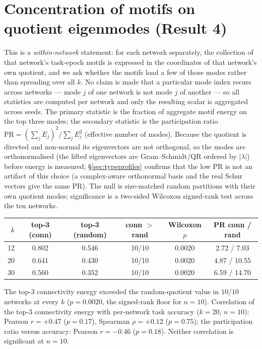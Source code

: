 \documentclass[11pt]{article}
\begin{document}
\section{Concentration of motifs on quotient eigenmodes (Result 4)}
\label{sec:concentration}
This is a \emph{within-network} statement: for each network separately, the collection of that
network's task-epoch motifs is expressed in the coordinates of that network's own quotient, and we
ask whether the motifs load a few of those modes rather than spreading over all $k$. No claim is
made that a particular mode index recurs across networks --- mode $j$ of one network is not mode
$j$ of another --- so all statistics are computed per network and only the resulting scalar is
aggregated across seeds. The primary statistic is the fraction of aggregate motif energy on the
top three modes; the secondary statistic is the participation ratio
$\mathrm{PR}=(\sum_{j}E_{j})^{2}/\sum_{j}E_{j}^{2}$ (effective number of modes). Because the
quotient is directed and non-normal its eigenvectors are not orthogonal, so the modes are
orthonormalised (the lifted eigenvectors are Gram--Schmidt/QR ordered by $\lvert\lambda\rvert$)
before energy is measured; \S\ref{sec:typeprofiles} confirms that the low PR is not an artifact of
this choice (a complex-aware orthonormal basis and the real Schur vectors give the same PR). The
null is size-matched random partitions with their own quotient modes; significance is a two-sided
Wilcoxon signed-rank test across the ten networks.
\begin{center}\small
\begin{tabular}{rccccc}
\toprule
$k$ & top-3 (conn) & top-3 (random) & conn $>$ rand & Wilcoxon $p$ & PR conn / rand \\
\midrule
12 & 0.802 & 0.546 & 10/10 & 0.0020 & 2.72 / 7.03 \\
20 & 0.641 & 0.430 & 10/10 & 0.0020 & 4.87 / 10.55 \\
30 & 0.560 & 0.352 & 10/10 & 0.0020 & 6.59 / 14.70 \\
\bottomrule
\end{tabular}
\end{center}
The top-3 connectivity energy exceeded the random-quotient value in $10/10$ networks at every
$k$ ($p=0.0020$, the signed-rank floor for $n=10$). Correlation of the top-3 connectivity energy
with per-network task accuracy ($k=20$, $n=10$): Pearson $r=+0.47$ ($p=0.17$), Spearman
$\rho=+0.12$ ($p=0.75$); the participation ratio versus accuracy: Pearson $r=-0.46$ ($p=0.18$).
Neither correlation is significant at $n=10$.
\end{document}
